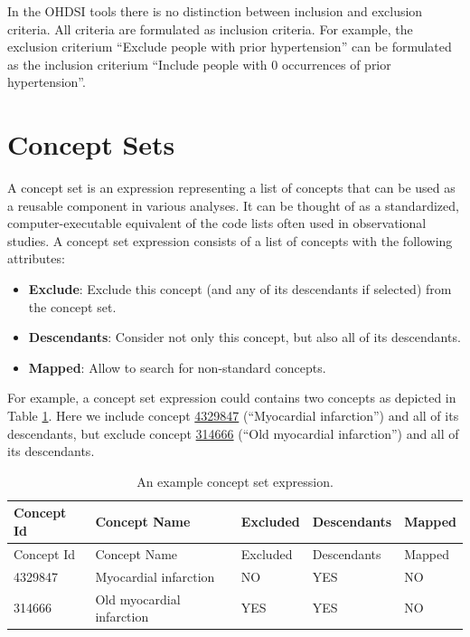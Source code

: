 \documentclass[11pt]{book}
\providecommand{\tightlist}{%
  \setlength{\itemsep}{0pt}\setlength{\parskip}{0pt}}
\theoremstyle{definition}
\theoremstyle{definition}
\theoremstyle{definition}
\theoremstyle{remark}
\let\BeginKnitrBlock\begin \let\EndKnitrBlock\end
\begin{document}
\BeginKnitrBlock{rmdimportant}
In the OHDSI tools there is no distinction between inclusion and
exclusion criteria. All criteria are formulated as inclusion criteria.
For example, the exclusion criterium ``Exclude people with prior
hypertension'' can be formulated as the inclusion criterium ``Include
people with 0 occurrences of prior hypertension''.
\EndKnitrBlock{rmdimportant}

\section{Concept Sets}\label{conceptSets}


A concept set is an expression representing a list of concepts that can
be used as a reusable component in various analyses. It can be thought
of as a standardized, computer-executable equivalent of the code lists
often used in observational studies. A concept set expression consists
of a list of concepts with the following attributes:

\begin{itemize}
\tightlist
\item
  \textbf{Exclude}: Exclude this concept (and any of its descendants if
  selected) from the concept set.
\item
  \textbf{Descendants}: Consider not only this concept, but also all of
  its descendants.
\item
  \textbf{Mapped}: Allow to search for non-standard concepts.
\end{itemize}

For example, a concept set expression could contains two concepts as
depicted in Table \ref{tab:conceptSetExpression}. Here we include
concept
\href{http://athena.ohdsi.org/search-terms/terms/4329847}{4329847}
(``Myocardial infarction'') and all of its descendants, but exclude
concept \href{http://athena.ohdsi.org/search-terms/terms/314666}{314666}
(``Old myocardial infarction'') and all of its descendants.

\begin{longtable}[]{@{}lllll@{}}
\caption{\label{tab:conceptSetExpression} An example concept set
expression.}\tabularnewline
\toprule
Concept Id & Concept Name & Excluded & Descendants &
Mapped\tabularnewline
\midrule
\endfirsthead
\toprule
Concept Id & Concept Name & Excluded & Descendants &
Mapped\tabularnewline
\midrule
\endhead
4329847 & Myocardial infarction & NO & YES & NO\tabularnewline
314666 & Old myocardial infarction & YES & YES & NO\tabularnewline
\bottomrule
\end{longtable}
\end{document}
